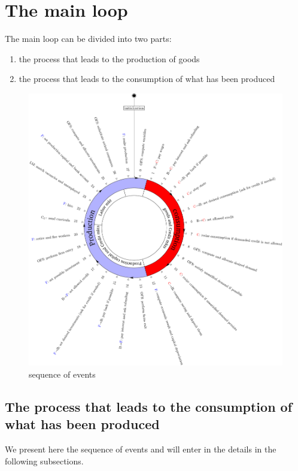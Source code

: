 \documentclass{book}
\begin{document}
\newpage
\section{The main loop}
The main loop can be divided into two parts:
\begin{enumerate}
	\item the process that leads to the production of goods
	\item the process that leads to the consumption of what has been produced
\end{enumerate}

\begin{figure}[htp]
	\centering
\includegraphics[scale=0.5]{visual1.pdf}
	\caption{sequence of events}
	\label{fig:clockcolor}
\end{figure}

\subsection{The process that leads to the consumption of what has been produced}
We present here the sequence of events and will enter in the details in the following subsections.
\end{document}
